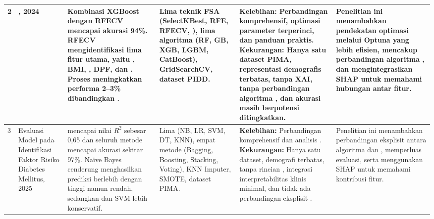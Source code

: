 \begin{landscape}
\begin{longtable}{|C{0.7cm}|L{2.9cm}|L{5.4cm}|L{3.0cm}|L{4.4cm}|L{3.7cm}|}
2 & , 2024 \cite{ref22} & Kombinasi XGBoost dengan RFECV mencapai akurasi 94\%. RFECV mengidentifikasi lima fitur utama, yaitu , BMI, , DPF, dan . Proses  meningkatkan performa 2--3\% dibandingkan . & Lima teknik FSA (SelectKBest, RFE, RFECV, ), lima algoritma  (RF, GB, XGB, LGBM, CatBoost), GridSearchCV, dataset PIDD. & \textbf{Kelebihan:} Perbandingan  komprehensif, optimasi parameter terperinci, dan panduan praktis. \newline\textbf{Kekurangan:} Hanya satu dataset PIMA, representasi demografis terbatas, tanpa XAI, tanpa perbandingan algoritma , dan akurasi masih berpotensi ditingkatkan. & Penelitian ini menambahkan pendekatan optimasi melalui Optuna yang lebih efisien, mencakup perbandingan algoritma , dan mengintegrasikan SHAP untuk memahami hubungan antar fitur.\\ \hline

3 & Evaluasi Model  pada Identifikasi Faktor Risiko Diabetes Mellitus, 2025 \cite{ref26} &  mencapai nilai $R^2$ sebesar 0,65 dan seluruh metode  mencapai akurasi sekitar 97\%. Naïve Bayes cenderung menghasilkan prediksi berlebih dengan  tinggi namun  rendah, sedangkan  dan SVM lebih konservatif. & Lima  (NB, LR, SVM, DT, KNN), empat metode  (Bagging, Boosting, Stacking, Voting), KNN Imputer, SMOTE, dataset PIMA. & \textbf{Kelebihan:} Perbandingan  komprehensif dan analisis . \newline\textbf{Kekurangan:} Hanya satu dataset, demografi terbatas, tanpa rincian , integrasi interpretabilitas klinis minimal, dan tidak ada perbandingan eksplisit . & Penelitian ini menambahkan perbandingan eksplisit antara algoritma  dan , memperluas evaluasi, serta menggunakan SHAP untuk memahami kontribusi fitur.\\ \hline


\end{longtable}
\end{landscape}

